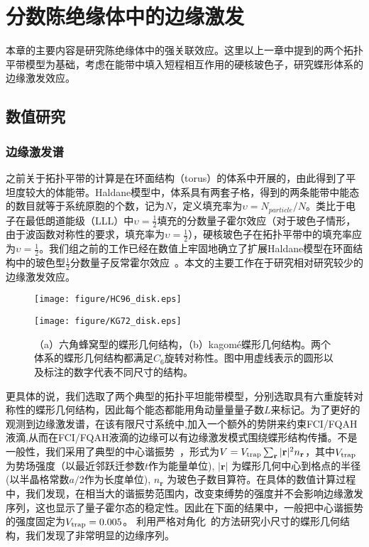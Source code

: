\chapter{分数陈绝缘体中的边缘激发}
\label{sec:FCIedge}

本章的主要内容是研究陈绝缘体中的强关联效应。这里以上一章中提到的两个拓扑平带模型为基础，考虑在能带中填入短程相互作用的硬核玻色子，研究蝶形体系的边缘激发效应。

\section{数值研究}
\subsection{边缘激发谱}
之前关于拓扑平带的计算是在环面结构（torus）的体系中开展的，由此得到了平坦度较大的体能带。Haldane模型中，体系具有两套子格，得到的两条能带中能态的数目就等于系统原胞的个数，记为$N$，定义填充率为$\upsilon=N_{particle}/N$。类比于电子在最低朗道能级（LLL）中$\upsilon=\frac{1}{2}$填充的分数量子霍尔效应（对于玻色子情形，由于波函数对称性的要求，填充率为$\upsilon=\frac{1}{2}$），硬核玻色子在拓扑平带中的填充率应为$\upsilon=\frac{1}{2}$。我们组之前的工作已经在数值上牢固地确立了扩展Haldane模型在环面结构中的玻色型$\frac{1}{2}$分数量子反常霍尔效应~\cite{Wang2011}。本文的主要工作在于研究相对研究较少的边缘激发效应。

\begin{figure}[!tb]
  \centering
  \begin{minipage}[c]{0.45\textwidth}
  \texttt{[image: figure/HC96\_disk.eps]}
\end{minipage}
\hfill
  \begin{minipage}[c]{0.45\textwidth}
  \texttt{[image: figure/KG72\_disk.eps]}
\end{minipage}
  \caption{（a）六角蜂窝型的蝶形几何结构，（b）kagom\'{e}蝶形几何结构。两个体系的蝶形几何结构都满足$C_6$旋转对称性。图中用虚线表示的圆形以及标注的数字代表不同尺寸的结构。}
\label{fig:disk}
\end{figure}

更具体的说，我们选取了两个典型的拓扑平坦能带模型，分别选取具有六重旋转对称性的蝶形几何结构，因此每个能态都能用角动量量量子数$L$来标记。为了更好的观测到边缘激发谱，在该有限尺寸系统中,加入一个额外的势阱来约束FCI/FQAH液滴,从而在FCI/FQAH液滴的边缘可以有边缘激发模式围绕蝶形结构传播。不是一般性，我们采用了典型的中心谐振势~\cite{Kjall2012}，形式为$V = V_{\rm trap}\sum_{\mathbf{r}} |\mathbf{r}|^2 n_{\mathbf{r}}$，其中$V_{\rm trap}$ 为势场强度（以最近邻跃迁参数$t$作为能量单位), $|{\mathbf{r}}|$ 为蝶形几何中心到格点的半径(以半晶格常数$a/2$作为长度单位),  $n_{\mathbf{r}}$ 为玻色子数目算符。在具体的数值计算过程中，我们发现，在相当大的谐振势范围内，改变束缚势的强度并不会影响边缘激发序列，这也显示了量子霍尔态的稳定性。因此在下面的结果中，一般把中心谐振势的强度固定为$V_{\rm trap}=0.005$。
利用严格对角化~的方法研究小尺寸的蝶形几何结构，我们发现了非常明显的边缘序列。

